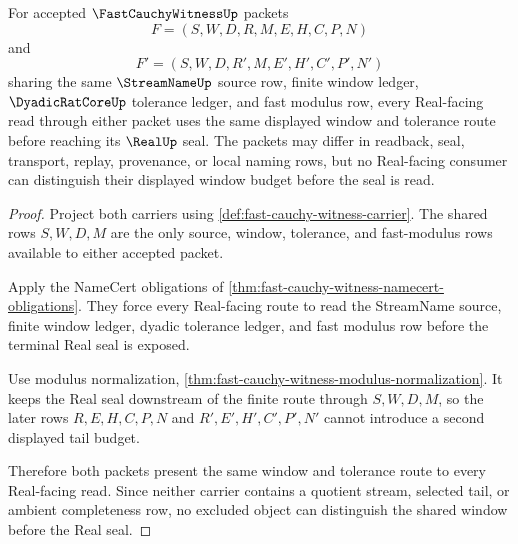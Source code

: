 \begin{theorem}
\label{thm:fast-cauchy-witness-window-determinacy}
For accepted $\FastCauchyWitnessUp$ packets
$$
F=(S,W,D,R,M,E,H,C,P,N)
$$
and
$$
F'=(S,W,D,R',M,E',H',C',P',N')
$$
sharing the same $\StreamNameUp$ source row, finite window ledger, $\DyadicRatCoreUp$ tolerance ledger, and fast modulus row, every Real-facing read through either packet uses the same displayed window and tolerance route before reaching its $\RealUp$ seal. The packets may differ in readback, seal, transport, replay, provenance, or local naming rows, but no Real-facing consumer can distinguish their displayed window budget before the seal is read.
\end{theorem}
\begin{proof}
Project both carriers using \autoref{def:fast-cauchy-witness-carrier}. The shared rows $S,W,D,M$ are the only source, window, tolerance, and fast-modulus rows available to either accepted packet.

Apply the NameCert obligations of \autoref{thm:fast-cauchy-witness-namecert-obligations}. They force every Real-facing route to read the StreamName source, finite window ledger, dyadic tolerance ledger, and fast modulus row before the terminal Real seal is exposed.

Use modulus normalization, \autoref{thm:fast-cauchy-witness-modulus-normalization}. It keeps the Real seal downstream of the finite route through $S,W,D,M$, so the later rows $R,E,H,C,P,N$ and $R',E',H',C',P',N'$ cannot introduce a second displayed tail budget.

Therefore both packets present the same window and tolerance route to every Real-facing read. Since neither carrier contains a quotient stream, selected tail, or ambient completeness row, no excluded object can distinguish the shared window before the Real seal.
\end{proof}


